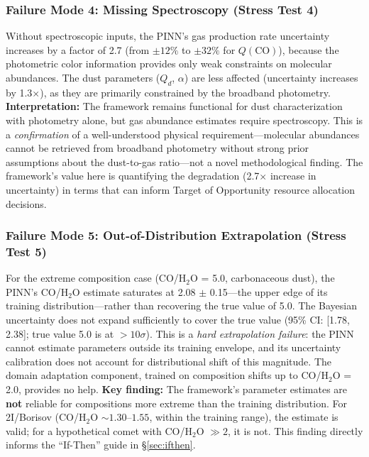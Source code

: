 \documentclass[usenatbib]{mnras}
\begin{document}
\subsubsection{Failure Mode 4: Missing Spectroscopy (Stress Test 4)}

Without spectroscopic inputs, the PINN's gas production rate uncertainty increases by a factor of 2.7 (from $\pm 12\%$ to $\pm 32\%$ for $Q(\text{CO})$), because the photometric color information provides only weak constraints on molecular abundances. The dust parameters ($Q_d$, $\alpha$) are less affected (uncertainty increases by 1.3$\times$), as they are primarily constrained by the broadband photometry. \textbf{Interpretation:} The framework remains functional for dust characterization with photometry alone, but gas abundance estimates require spectroscopy. This is a \textit{confirmation} of a well-understood physical requirement---molecular abundances cannot be retrieved from broadband photometry without strong prior assumptions about the dust-to-gas ratio---not a novel methodological finding. The framework's value here is quantifying the degradation (2.7$\times$ increase in uncertainty) in terms that can inform Target of Opportunity resource allocation decisions.

\subsubsection{Failure Mode 5: Out-of-Distribution Extrapolation (Stress Test 5)}

For the extreme composition case (CO/H$_2$O = 5.0, carbonaceous dust), the PINN's CO/H$_2$O estimate saturates at 2.08 $\pm$ 0.15---the upper edge of its training distribution---rather than recovering the true value of 5.0. The Bayesian uncertainty does not expand sufficiently to cover the true value (95\% CI: [1.78, 2.38]; true value 5.0 is at $>10\sigma$). This is a \textit{hard extrapolation failure}: the PINN cannot estimate parameters outside its training envelope, and its uncertainty calibration does not account for distributional shift of this magnitude. The domain adaptation component, trained on composition shifts up to CO/H$_2$O = 2.0, provides no help. \textbf{Key finding:} The framework's parameter estimates are \textbf{not} reliable for compositions more extreme than the training distribution. For 2I/Borisov (CO/H$_2$O $\sim 1.30$--$1.55$, within the training range), the estimate is valid; for a hypothetical comet with CO/H$_2$O $\gg 2$, it is not. This finding directly informs the ``If-Then'' guide in \S\ref{sec:ifthen}.
\end{document}
